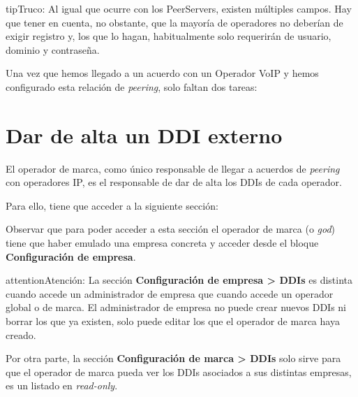 \documentclass[letterpaper,10pt,spanish]{sphinxmanual}
\begin{document}
\begin{notice}{tip}{Truco:}
Al igual que ocurre con los PeerServers, existen múltiples campos. Hay que tener en cuenta, no obstante, que la mayoría de operadores no deberían de exigir registro y, los que lo hagan, habitualmente solo requerirán de usuario, dominio y contraseña.
\end{notice}

Una vez que hemos llegado a un acuerdo con un Operador VoIP y hemos configurado esta relación de \emph{peering}, solo faltan dos tareas:


\section{Dar de alta un DDI externo}
\label{external_incoming_calls/configure_ddi:settingup-ddi}\label{external_incoming_calls/configure_ddi:dar-de-alta-un-ddi-externo}\label{external_incoming_calls/configure_ddi::doc}
El operador de marca, como único responsable de llegar a acuerdos de \emph{peering} con operadores IP, es el responsable de dar de alta los DDIs de cada operador.

Para ello, tiene que acceder a la siguiente sección:


Observar que para poder acceder a esta sección el operador de marca (o \emph{god}) tiene que haber emulado una empresa concreta y acceder desde el bloque \textbf{Configuración de empresa}.

\begin{notice}{attention}{Atención:}
La sección \textbf{Configuración de empresa \textgreater{} DDIs} es distinta cuando accede un administrador de empresa que cuando accede un operador global o de marca. El administrador de empresa no puede crear nuevos DDIs ni borrar los que ya existen, solo puede editar los que el operador de marca haya creado.
\end{notice}

Por otra parte, la sección \textbf{Configuración de marca \textgreater{} DDIs} solo sirve para que el operador de marca pueda ver los DDIs asociados a sus distintas empresas, es un listado en \emph{read-only}.

\end{document}
